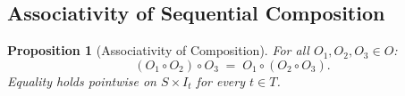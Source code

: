 \documentclass[12pt,openany]{book}
\newcommand{\calI}{\mathcal{I}}
\numberwithin{equation}{chapter}
\theoremstyle{plain}
\newtheorem{proposition}[theorem]{Proposition}
\theoremstyle{definition}
\theoremstyle{remark}
\numberwithin{equation}{chapter}
\theoremstyle{plain}
\newcommand{\calO}{\mathcal{O}}
\newcommand{\calS}{\mathcal{S}}
\newcommand{\calT}{\mathcal{T}}
\def\calI{I}%
\def\calS{S}%
\def\calT{T}%
\def\calO{O}%
\begin{document}
\subsection{Associativity of Sequential Composition}
\label{subsec:assoc}

\begin{proposition}[Associativity of Composition]
\label{prop:assoc}
For all $O_1, O_2, O_3 \in \calO$:
\begin{equation}
  (O_1 \circ O_2) \circ O_3
  \;=\;
  O_1 \circ (O_2 \circ O_3).
  \label{eq:assoc}
\end{equation}
Equality holds pointwise on $\calS \times \calI_t$ for every
$t \in \calT$.
\end{proposition}
\end{document}
